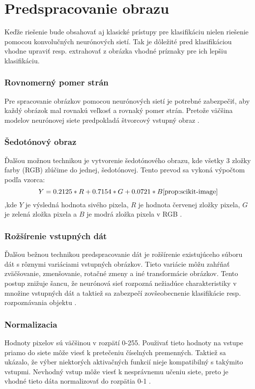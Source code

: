 
\section{Predspracovanie obrazu}
\label{sec:preprocessing}
Keďže riešenie bude obsahovať aj klasické prístupy pre klasifikáciu nielen riešenie pomocou konvolučných neurónových sietí.
Tak je dôležité pred klasifikáciou vhodne upraviť resp. extrahovať z obrázka vhodné príznaky pre ich lepšiu klasifikáciu.

\subsubsection{Rovnomerný pomer strán}
Pre spracovanie obrázkov pomocou neurónových sietí je potrebné zabezpečiť, aby každý obrázok mal rovnakú veľkosť a rovnaký pomer strán.
Pretože väčšina modelov neurónovej siete predpokladá štvorcový vstupný obraz \cite{odkaz:NNPreprocessing}.

\subsubsection{Šedotónový obraz}
Ďalšou možnou technikou je vytvorenie šedotónového obrazu, kde všetky 3 zložky farby (RGB) zlúčime do jednej, šedotónovej.
Tento prevod sa vykoná výpočtom podľa vzorca:
\begin{equation}
    \label{eq:rgbtogray}
    Y = 0.2125*R + 0.7154*G + 0.0721*B \cite{prop:scikit-image}
\end{equation}
,kde $Y$ je výsledná hodnota sivého pixela, $R$ je hodnota červenej zložky pixela,
$G$ je zelená zložka pixela a $B$ je modrá zložka pixela v RGB \cite{odkaz:NNPreprocessing}.

\subsubsection{Rožšírenie vstupných dát}
Ďalšou bežnou technikou predspracovanie dát je rožšírenie existujúceho súboru dát s rôznymi variáciami vstupných obrázkov.
Tieto variácie môžu zahŕňať zväčšovanie, zmenšovanie, rotačné zmeny a iné transformácie obrázkov.
Tento postup znižuje šancu, že neurónová sieť rozpozná nežiadúce charakteristiky v množine vstupných dát
	a taktiež sa zabezpečí zovšeobecnenie klasifikácie resp. rozpoznávania objektu \cite{odkaz:NNPreprocessing}.

\subsubsection{Normalizacia}
Hodnoty pixelov sú väčšinou v rozpätí 0-255. Použivať tieto hodnoty na vstupe priamo do siete môže viesť k pretečeniu číselných premenných.
Taktiež sa ukázalo, že výber niektorých aktivačných funkcií nieje kompatibilný s takýmito vstupmi.
Nevhodný vstup môže viesť k nesprávnemu učeniu siete, preto je vhodné tieto dáta normalizovať do rozpätia 0-1 \cite{odkaz:PreprocessingNormalization}.

